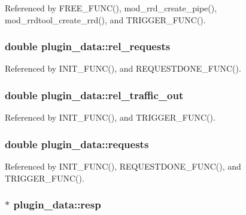Referenced by F\-R\-E\-E\-\_\-\-F\-U\-N\-C(), mod\-\_\-rrd\-\_\-create\-\_\-pipe(), mod\-\_\-rrdtool\-\_\-create\-\_\-rrd(), and T\-R\-I\-G\-G\-E\-R\-\_\-\-F\-U\-N\-C().

\hypertarget{structplugin__data_adba1356a5aefd70b811033c1a9004ca1}{
\subsubsection[{rel\-\_\-requests}]{\setlength{\rightskip}{0pt plus 5cm}double plugin\-\_\-data\-::rel\-\_\-requests}}\label{structplugin__data_adba1356a5aefd70b811033c1a9004ca1}


Referenced by I\-N\-I\-T\-\_\-\-F\-U\-N\-C(), and R\-E\-Q\-U\-E\-S\-T\-D\-O\-N\-E\-\_\-\-F\-U\-N\-C().

\hypertarget{structplugin__data_a144e40fe878fe71e8ecee5149f9a0bf6}{
\subsubsection[{rel\-\_\-traffic\-\_\-out}]{\setlength{\rightskip}{0pt plus 5cm}double plugin\-\_\-data\-::rel\-\_\-traffic\-\_\-out}}\label{structplugin__data_a144e40fe878fe71e8ecee5149f9a0bf6}


Referenced by I\-N\-I\-T\-\_\-\-F\-U\-N\-C(), and T\-R\-I\-G\-G\-E\-R\-\_\-\-F\-U\-N\-C().

\hypertarget{structplugin__data_a28db9b2a210fa14e534f1f0f43d5eda5}{
\subsubsection[{requests}]{\setlength{\rightskip}{0pt plus 5cm}double plugin\-\_\-data\-::requests}}\label{structplugin__data_a28db9b2a210fa14e534f1f0f43d5eda5}


Referenced by I\-N\-I\-T\-\_\-\-F\-U\-N\-C(), R\-E\-Q\-U\-E\-S\-T\-D\-O\-N\-E\-\_\-\-F\-U\-N\-C(), and T\-R\-I\-G\-G\-E\-R\-\_\-\-F\-U\-N\-C().

\hypertarget{structplugin__data_a3e2075bcd5ed8ffa436c5db0fdb8a928}{
\subsubsection[{resp}]{$\ast$ plugin\-\_\-data\-::resp}}\label{structplugin__data_a3e2075bcd5ed8ffa436c5db0fdb8a928}


